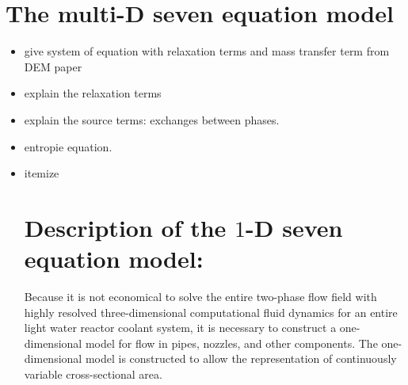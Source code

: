 \section{The multi-D seven equation model}
\begin{itemize}
\item give system of equation with relaxation terms and mass transfer term from DEM paper
\item explain the relaxation terms
\item explain the source terms: exchanges between phases.
\item entropie equation.
\item{itemize}
\section{Description of the $1$-D seven equation model:}
Because it is not economical to solve the entire two-phase flow field
with highly resolved three-dimensional computational fluid dynamics for an
entire light water reactor coolant system,
it is necessary to construct a one-dimensional model for flow in
pipes, nozzles, and other components.  The one-dimensional model is
constructed to allow the representation of continuously variable
cross-sectional area.


\end{itemize}
